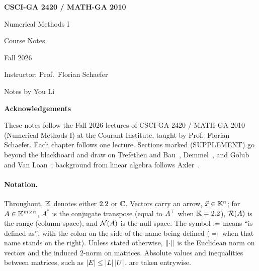 \documentclass[11pt,oneside]{report}
\begin{document}
\begin{titlepage}
  \raggedright
  \vspace*{2in}
  {\Huge\bfseries CSCI-GA 2420 / MATH-GA 2010\par}
  \vspace{8pt}
  {\LARGE Numerical Methods I\par}
  \vspace{8pt}
  {\LARGE Course Notes\par}
  \vspace{8pt}
  {\Large Fall 2026\par}
  \vspace{24pt}
  {\large Instructor: Prof.\ Florian Schaefer\par}
  \vspace{4pt}
  {\large Notes by You Li\par}
\end{titlepage}

\thispagestyle{fancy}
\markright{}
{\Large\bfseries Acknowledgements\par}
\vspace{6pt}
These notes follow the Fall 2026 lectures of CSCI-GA 2420 / MATH-GA 2010 (Numerical Methods I) at the Courant Institute, taught by Prof.\ Florian Schaefer. Each chapter follows one lecture. Sections marked (SUPPLEMENT) go beyond the blackboard and draw on Trefethen and Bau~\cite{TB}, Demmel~\cite{Demmel}, and Golub and Van Loan~\cite{GVL}; background from linear algebra follows Axler~\cite{Axler}.

\paragraph{Notation.} Throughout, $\mathbb{K}$ denotes either $2.2$ or $\mathbb{C}$. Vectors carry an arrow, $\vec{x} \in \mathbb{K}^n$; for $A \in \mathbb{K}^{m \times n}$, $A^\ast$ is the conjugate transpose (equal to $A^\top$ when $\mathbb{K} = 2.2$), $\mathcal{R}(A)$ is the range (column space), and $\mathcal{N}(A)$ is the null space. The symbol $\coloneqq$ means ``is defined as'', with the colon on the side of the name being defined ($\eqqcolon$ when that name stands on the right). Unless stated otherwise, $\left\lVert \cdot \right\rVert$ is the Euclidean norm on vectors and the induced $2$-norm on matrices. Absolute values and inequalities between matrices, such as $\left\lvert E \right\rvert \le \left\lvert L \right\rvert\left\lvert U \right\rvert$, are taken entrywise.

\setcounter{tocdepth}{1}
\tableofcontents

















\end{document}

